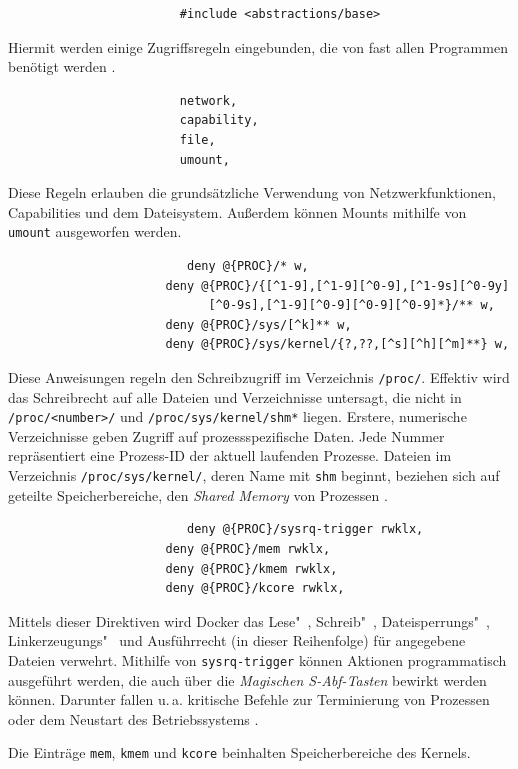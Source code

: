\documentclass[../main.tex]{subfiles}
\begin{document}
					\clearpage

					\begin{lstlisting}
						#include <abstractions/base>
					\end{lstlisting}
					Hiermit werden einige Zugriffsregeln eingebunden, die von fast allen Programmen benötigt werden \cite[S.100]{SELinuxApparmor}.

					\begin{lstlisting}
						network,
						capability,
						file,
						umount,
					\end{lstlisting}
					Diese Regeln erlauben die grundsätzliche Verwendung von Netzwerkfunktionen, Capabilities und dem Dateisystem. Außerdem können Mounts mithilfe von \texttt{umount} ausgeworfen werden.

					\begin{lstlisting}
						 deny @{PROC}/* w,
					  deny @{PROC}/{[^1-9],[^1-9][^0-9],[^1-9s][^0-9y]
						    [^0-9s],[^1-9][^0-9][^0-9][^0-9]*}/** w,
					  deny @{PROC}/sys/[^k]** w,
					  deny @{PROC}/sys/kernel/{?,??,[^s][^h][^m]**} w,
					\end{lstlisting}
					Diese Anweisungen regeln den Schreibzugriff im Verzeichnis \texttt{/proc/}. Effektiv wird das Schreibrecht auf alle Dateien und Verzeichnisse untersagt, die nicht in \texttt{/proc/<number>/} und \texttt{/proc/sys/kernel/shm*} liegen. Erstere, numerische Verzeichnisse geben Zugriff auf prozessspezifische Daten. Jede Nummer repräsentiert eine Prozess-ID der aktuell laufenden Prozesse. Dateien im Verzeichnis \texttt{/proc/sys/kernel/}, deren Name mit \texttt{shm} beginnt, beziehen sich auf geteilte Speicherbereiche, den \emph{Shared Memory} von Prozessen \cite{apparmorShm}.

					\begin{lstlisting}
						 deny @{PROC}/sysrq-trigger rwklx,
					  deny @{PROC}/mem rwklx,
					  deny @{PROC}/kmem rwklx,
					  deny @{PROC}/kcore rwklx,
					\end{lstlisting}
					Mittels dieser Direktiven wird Docker das Lese"~, Schreib"~, Dateisperrungs"~, Linkerzeugungs"~ und Ausführrecht (in dieser Reihenfolge) für angegebene Dateien verwehrt. Mithilfe von \texttt{sysrq-trigger} können Aktionen programmatisch ausgeführt werden, die auch über die \emph{Magischen S-Abf-Tasten} bewirkt werden können. Darunter fallen u.\,a. kritische Befehle zur Terminierung von Prozessen oder dem Neustart des Betriebssystems \cite{apparmorMagicSysRQ}\cite{apparmorSysrqTrigger}.

					Die Einträge \texttt{mem}, \texttt{kmem} und \texttt{kcore} beinhalten Speicherbereiche des Kernels.
\end{document}
